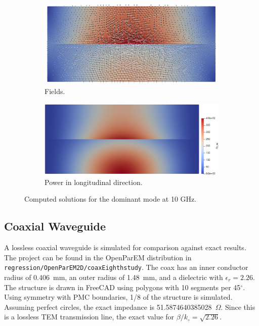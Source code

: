 \documentclass[titlepage]{article}
\renewcommand\_{\textunderscore\linebreak[1]}
\begin{document}
\begin{figure}[H]
  \centering
  \begin{subfigure}{0.429\textwidth}
     \includegraphics[width=\linewidth]{../regression/OpenParEM2D/partially_filled_rect_waveguide/PartFilled_order_6_study/screenshots/partial_field}
     \caption{Fields.}
  \end{subfigure}
  \begin{subfigure}{0.471\textwidth}
     \includegraphics[width=\linewidth]{../regression/OpenParEM2D/partially_filled_rect_waveguide/PartFilled_order_6_study/screenshots/partial_power}
     \caption{Power in longitudinal direction.}
  \end{subfigure}
  \caption{Computed solutions for the dominant mode at 10 GHz.}
  \label{fig:partial_field_power}
\end{figure}

\subsection{Coaxial Waveguide}

A lossless coaxial waveguide is simulated for comparison against exact results.  The project can be found in the OpenParEM distribution in \texttt{regression/OpenParEM2D/coaxEighth\_study}.  The coax has an inner conductor radius of 0.406~mm, an outer radius of 1.48~mm, and a dielectric with $\epsilon_r=2.26$.  The structure is drawn in FreeCAD using polygons with 10 segments per 45$^{\circ}$. Using symmetry with PMC boundaries, 1/8 of the structure is simulated.  Assuming perfect circles, the exact impedance is 51.5874640385028~$\Omega$.  Since this is a lossless TEM transmission line, the exact value for $\beta/k_{\circ}=\sqrt{2.26}$.
\end{document}
